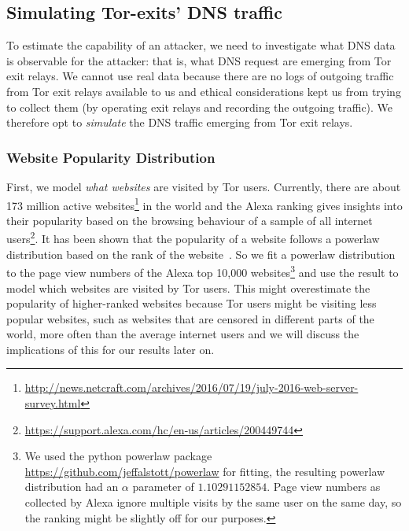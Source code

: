 \subsection{Simulating Tor-exits' DNS traffic}
\label{sec:attack:sim}
To estimate the capability of an attacker, we need to investigate what
DNS data is observable for the attacker: that is, what DNS request are
emerging from Tor exit relays.
We cannot use real data because there are no logs of outgoing traffic
from Tor exit relays available to us and ethical considerations kept us
from trying to collect them (\eg by operating exit relays and recording
the outgoing traffic). We therefore opt to \emph{simulate} the DNS traffic
emerging from Tor exit relays.

\subsubsection{Website Popularity Distribution}
\label{sec:attack:pop}
First, we model \emph{what websites} are visited by Tor users.
Currently, there are about 173 million active
websites\footnote{\url{http://news.netcraft.com/archives/2016/07/19/july-2016-web-server-survey.html}}
in the world and the Alexa ranking gives insights into their popularity
based on the browsing behaviour of a sample of all internet
users\footnote{\url{https://support.alexa.com/hc/en-us/articles/200449744}}.
It has been shown that the popularity of a website follows a powerlaw
distribution based on the rank of the
website~\cite{DBLP:journals/network/MahantiCMAW13}. So
we fit a powerlaw distribution to the page view numbers of the Alexa top
10,000 websites\footnote{We used the python powerlaw package
		\url{https://github.com/jeffalstott/powerlaw} for fitting, the
		resulting powerlaw distribution had an $\alpha$ parameter of
		$1.10291152854$. Page view numbers as collected by Alexa ignore
		multiple visits by the same user on the same day, so the ranking
		might be slightly off for our purposes.} and use the result to
model which websites are visited by Tor users.
This might overestimate the popularity of higher-ranked websites because
Tor users might be visiting less popular websites, such as websites that
are censored in different parts of the world, more often than the
average internet users and we will discuss the implications of this for
our results later on.

